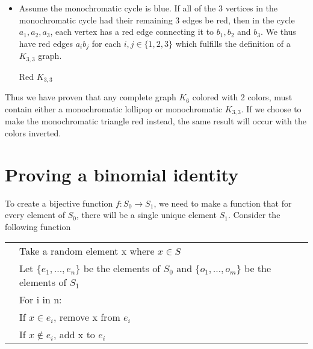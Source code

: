 \documentclass{article}
\begin{document}
\begin{enumerate}
\begin{itemize}
    \item Assume the monochromatic cycle is blue. If all of the 3 vertices in the monochromatic cycle had their remaining 3 edges be red, then in the cycle $a_1, a_2, a_3$, each vertex has a red edge connecting it to $b_1, b_2$ and $b_3$. We thus have red edges $a_ib_j$ for each $i,j \in \{1, 2, 3\}$ which fulfills the definition of a $K_{3,3}$ graph.
    \begin{center}
        Red $K_{3,3}$
    \end{center}
\end{itemize}
\end{enumerate}

Thus we have proven that any complete graph $K_6$ colored with 2 colors, must contain either a monochromatic lollipop or monochromatic $K_{3,3}$. If we choose to make the monochromatic triangle red instead, the same result will occur with the colors inverted.

\section{Proving a binomial identity}
    To create a bijective function $f : S_0 \rightarrow S_1$, we need to make a function that for every element of $S_0$, there will be a single unique element $S_1$. Consider the following function

    \begin{tabular}{c|l}
         & Take a random element x where $x \in S$ \\
         & Let $\{e_1, ... ,e_n\}$ be the elements of $S_0$ and $\{o_1, ... , o_m\}$ be the elements of $S_1$ \\
         & For i in n: \\
         & \hspace{5mm} If $x \in e_i$, remove x from $e_i$ \\
         & \hspace{5mm} If $x \not\in e_i$, add x to $e_i$ \\
    \end{tabular}
    
\end{document}

